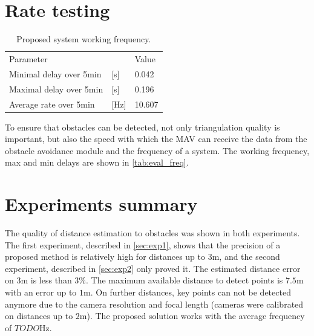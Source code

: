 \section{Rate testing}
\begin{table}[ht]
    \begin{center}
      \begin{tabular}{lll}
      \hline
        Parameter & & Value \\
        Minimal delay over 5min & [s]  & 0.042 \\
        Maximal delay over 5min & [s]  & 0.196 \\
        Average rate over 5min  & [Hz] & 10.607 \\ 
      \end{tabular}
    \end{center}
    \caption{Proposed system working frequency.}
    \label{tab:eval_freq}
\end{table}

To ensure that obstacles can be detected, not only triangulation quality is important, but also the speed with which the MAV can receive the data from the obstacle avoidance module and the frequency of a system.
The working frequency, max and min delays are shown in \autoref{tab:eval_freq}.
 
\section{Experiments summary}
The quality of distance estimation to obstacles was shown in both experiments.
The first experiment, described in \autoref{sec:exp1}, shows that the precision of a proposed method is relatively high for distances up to 3m, and the second experiment, described in \autoref{sec:exp2} only proved it. 
The estimated distance error on $3$m is less than $3\%$.
The maximum available distance to detect points is $7.5$m with an error up to $1$m.
On further distances, key points can not be detected anymore due to the camera resolution and focal length (cameras were calibrated on distances up to $2$m).
The proposed solution works with the average frequency of $TODO$Hz.
